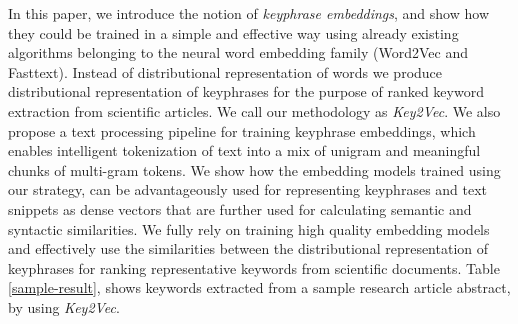 \documentclass[11pt,a4paper]{article}
\begin{document}
In this paper, we introduce the notion of \textit{keyphrase embeddings}, and show how they could be trained in a simple and effective way using already existing algorithms belonging to the neural word embedding family (Word2Vec and Fasttext). Instead of distributional representation of words we produce distributional representation of keyphrases for the purpose of ranked keyword extraction from scientific articles. We call our methodology as \textit{Key2Vec}. We also propose a text processing pipeline for training keyphrase embeddings, which enables intelligent tokenization of text into a mix of unigram and meaningful chunks of multi-gram tokens. We show how the embedding models trained using our strategy, can be advantageously used for representing keyphrases and text snippets as dense vectors that are further used for calculating semantic and syntactic similarities. We fully rely on training high quality embedding models and effectively use the similarities between the distributional representation of keyphrases for ranking representative keywords from scientific documents. Table \ref{sample-result}, shows keywords extracted from a sample research article abstract, by using \textit{Key2Vec}.  
\end{document}
